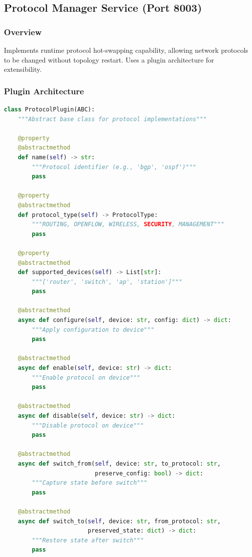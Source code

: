 \documentclass[10pt,a4paper]{article}
\begin{document}
\subsection{Protocol Manager Service (Port 8003)}

\subsubsection{Overview}
Implements runtime protocol hot-swapping capability, allowing network protocols to be changed without topology restart. Uses a plugin architecture for extensibility.

\subsubsection{Plugin Architecture}

\begin{lstlisting}[language=python, caption=Protocol Plugin Base Class]
class ProtocolPlugin(ABC):
    """Abstract base class for protocol implementations"""

    @property
    @abstractmethod
    def name(self) -> str:
        """Protocol identifier (e.g., 'bgp', 'ospf')"""
        pass

    @property
    @abstractmethod
    def protocol_type(self) -> ProtocolType:
        """ROUTING, OPENFLOW, WIRELESS, SECURITY, MANAGEMENT"""
        pass

    @property
    @abstractmethod
    def supported_devices(self) -> List[str]:
        """['router', 'switch', 'ap', 'station']"""
        pass

    @abstractmethod
    async def configure(self, device: str, config: dict) -> dict:
        """Apply configuration to device"""
        pass

    @abstractmethod
    async def enable(self, device: str) -> dict:
        """Enable protocol on device"""
        pass

    @abstractmethod
    async def disable(self, device: str) -> dict:
        """Disable protocol on device"""
        pass

    @abstractmethod
    async def switch_from(self, device: str, to_protocol: str,
                          preserve_config: bool) -> dict:
        """Capture state before switch"""
        pass

    @abstractmethod
    async def switch_to(self, device: str, from_protocol: str,
                        preserved_state: dict) -> dict:
        """Restore state after switch"""
        pass
\end{lstlisting}
\end{document}
